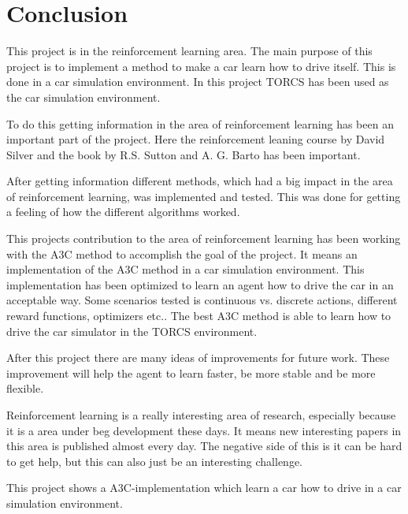 \chapter{Conclusion}\label{Conclusion}
This project is in the reinforcement learning area. The main purpose of this project is to implement a method to make a car learn how to drive itself. This is done in a car simulation environment. In this project TORCS has been used as the car simulation environment. 

To do this getting information in the area of reinforcement learning has been an important part of the project. Here the reinforcement leaning course by David Silver \cite{RL_course} and the book by R.S. Sutton and A. G. Barto \cite{Sutton} has been important. 

After getting information different methods, which had a big impact in the area of reinforcement learning, was implemented and tested. This was done for getting a feeling of how the different algorithms worked. 

This projects contribution to the area of reinforcement learning has been working with the A3C method to accomplish the goal of the project. It means an implementation of the A3C method in a car simulation environment. This implementation has been optimized to learn an agent how to drive the car in an acceptable way. Some scenarios tested is continuous vs. discrete actions, different reward functions, optimizers etc.. The best A3C method is able to learn how to drive the car simulator in the TORCS environment.   

After this project there are many ideas of improvements for future work. These improvement will help the agent to learn faster, be more stable and be more flexible.

Reinforcement learning is a really interesting area of research, especially because it is a area under beg development these days. It means new interesting papers in this area is published almost every day. The negative side of this is it can be hard to get help, but this can also just be an interesting challenge.

This project shows a A3C-implementation which learn a car how to drive in a car simulation environment.      